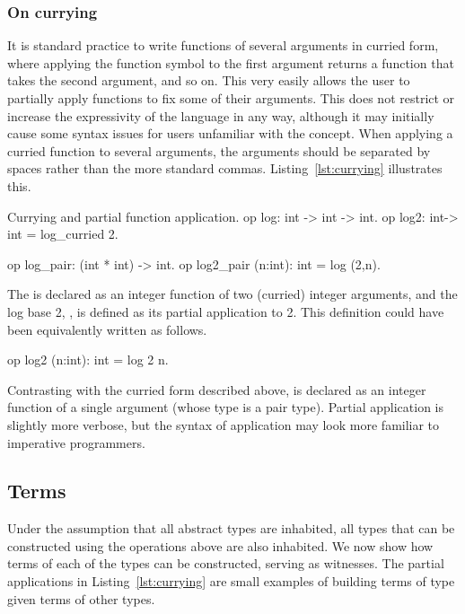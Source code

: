 \subsubsection*{On currying}
It is standard practice to write functions of several arguments in curried form,
where applying the function symbol to the first argument returns a function that
takes the second argument, and so on. This very easily allows the user to
partially apply functions to fix some of their arguments. This does not restrict
or increase the expressivity of the language in any way, although it may
initially cause some syntax issues for users unfamiliar with the concept. When
applying a curried function to several arguments, the arguments should be
separated by spaces rather than the more standard commas.
Listing~\ref{lst:currying} illustrates this.

\begin{easycrypt}[label={lst:currying}]{Currying and partial function application.}
op log: int -> int -> int.
op log2: int-> int = log_curried 2.

op log_pair: (int * int) -> int.
op log2_pair (n:int): int = log (2,n).
\end{easycrypt}

The  is declared as an integer function of two (curried) integer
arguments, and the log base 2, , is defined as its partial
application to 2. This definition could have been equivalently written as
follows.
\begin{easycrypt}[frame=none]{}
op log2 (n:int): int = log 2 n.
\end{easycrypt}
Contrasting with the curried form described above,  is declared
as an integer function of a single argument (whose type is a pair type).
Partial application is slightly more verbose, but the syntax of application may
look more familiar to imperative programmers.

\subsection{Terms}
Under the assumption that all abstract types are inhabited, all types that can
be constructed using the operations above are also inhabited. We now show how
terms of each of the types can be constructed, serving as witnesses. The partial
applications in Listing~\ref{lst:currying} are small examples of building terms
of type  given terms of other types.

